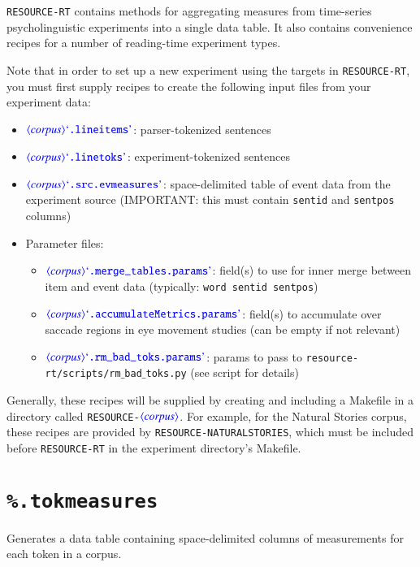 \documentclass[12pt]{report}
\def\blue{\color{blue}}
\begin{document}
{\tt RESOURCE-RT} contains methods for aggregating measures from time-series psycholinguistic experiments into a single data table.
It also contains convenience recipes for a number of reading-time experiment types.

Note that in order to set up a new experiment using the targets in {\tt RESOURCE-RT}, you must first supply recipes to create the following input files from your experiment data:

\begin{itemize}
\item {\tt\blue $\dtype{corpus} \dcode{.lineitems}$}: parser-tokenized sentences
\item {\tt\blue $\dtype{corpus} \dcode{.linetoks}$}: experiment-tokenized sentences
\item {\tt\blue $\dtype{corpus} \dcode{.src.evmeasures}$}: space-delimited table of event data from the experiment source (IMPORTANT: this must contain {\tt\blue sentid} and {\tt\blue sentpos} columns)
\item Parameter files:
\begin{itemize}
\item {\tt\blue $\dtype{corpus} \dcode{.merge\_tables.params}$}: field(s) to use for inner merge between item and event data (typically: {\tt\blue word sentid sentpos})
\item {\tt\blue $\dtype{corpus} \dcode{.accumulateMetrics.params}$}: field(s) to accumulate over saccade regions in eye movement studies (can be empty if not relevant) 
\item {\tt\blue $\dtype{corpus} \dcode{.rm\_bad\_toks.params}$}: params to pass to {\tt\blue resource-rt/scripts/rm$\_$bad$\_$toks.py} (see script for details) 
\end{itemize}
\end{itemize}

Generally, these recipes will be supplied by creating and including a Makefile in a directory called {\tt RESOURCE-$\dtype{corpus}$}.
For example, for the Natural Stories corpus, these recipes are provided by {\tt RESOURCE-NATURALSTORIES}, which must be included before {\tt RESOURCE-RT} in the experiment directory's Makefile.

\section{{\blue\tt \%.tokmeasures}}

Generates a data table containing space-delimited columns of measurements for each token in a corpus.
\end{document}
